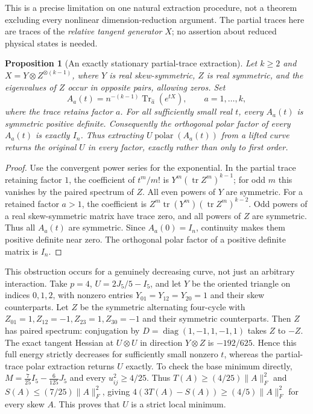 \documentclass[11pt]{article}
\newtheorem{proposition}[theorem]{Proposition}
\begin{document}
This is a precise limitation on one natural extraction procedure, not
a theorem excluding every nonlinear dimension-reduction argument.
The partial traces here are traces of the \emph{relative tangent
generator} $X$; no assertion about reduced physical states is needed.

\begin{proposition}[An exactly stationary partial-trace extraction]
 Let $k\ge2$ and $X=Y\otimes Z^{\otimes(k-1)}$, where $Y$ is real skew-symmetric,
$Z$ is real symmetric, and the eigenvalues of $Z$ occur in opposite
pairs, allowing zeros. Set
\[
 A_a(t)=n^{-(k-1)}\operatorname{Tr}_{\widehat a}(e^{tX}),
 \qquad a=1,\ldots,k,
\]
where the trace retains factor $a$. For all sufficiently small real
$t$, every $A_a(t)$ is symmetric positive definite. Consequently the
orthogonal polar factor of every $A_a(t)$ is exactly $I_n$.
Thus extracting $U\operatorname{polar}(A_a(t))$ from a lifted curve
returns the original $U$ in every factor, exactly rather than only
to first order.
\end{proposition}
\begin{proof}
Use the convergent power series for the exponential. In the partial
trace retaining factor $1$, the coefficient of $t^m/m!$ is
$Y^m(\operatorname{tr}Z^m)^{k-1}$; for odd $m$ this vanishes by the
paired spectrum of $Z$. All even powers of $Y$ are symmetric.
For a retained factor $a>1$, the coefficient is
$Z^m\operatorname{tr}(Y^m)(\operatorname{tr}Z^m)^{k-2}$.
Odd powers of a real skew-symmetric matrix have trace zero, and
all powers of $Z$ are symmetric. Thus all $A_a(t)$ are symmetric.
Since $A_a(0)=I_n$, continuity makes them positive definite near zero.
The orthogonal polar factor of a positive definite matrix is $I_n$.
\end{proof}

This obstruction occurs for a genuinely decreasing curve, not just an
arbitrary interaction. Take $p=4$, $U=2J_5/5-I_5$, and let $Y$ be the
oriented triangle on indices $0,1,2$, with nonzero entries
$Y_{01}=Y_{12}=Y_{20}=1$ and their skew counterparts. Let $Z$ be the
symmetric alternating four-cycle with
$Z_{01}=1,Z_{12}=-1,Z_{23}=1,Z_{30}=-1$ and their symmetric counterparts.
Then $Z$ has paired spectrum: conjugation by
$D=\operatorname{diag}(1,-1,1,-1,1)$ takes $Z$ to $-Z$.
The exact tangent Hessian at $U\otimes U$ in direction $Y\otimes Z$
is $-192/625$. Hence this full energy strictly decreases for sufficiently
small nonzero $t$, whereas the partial-trace polar extraction returns
$U$ exactly. To check the base minimum directly,
$M=\frac7{25}I_5-\frac6{125}J_5$ and every $u_{ij}^2\ge4/25$.
Thus $T(A)\ge(4/25)\|A\|_F^2$ and
$S(A)\le(7/25)\|A\|_F^2$, giving
$4(3T(A)-S(A))\ge(4/5)\|A\|_F^2$ for every skew $A$.
This proves that $U$ is a strict local minimum.
\end{document}
